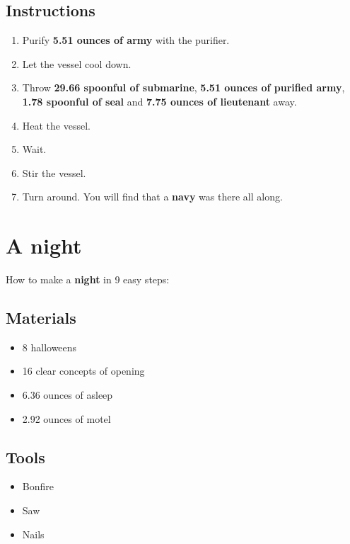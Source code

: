\documentclass{article}
\begin{document}
\subsection{Instructions}\begin{enumerate}
\item 
Purify \textbf{5.51 ounces of army} with the purifier.
\item 
Let the vessel cool down.
\item 
Throw \textbf{29.66 spoonful of submarine}, \textbf{5.51 ounces of purified army}, \textbf{1.78 spoonful of seal} and \textbf{7.75 ounces of lieutenant} away.
\item 
Heat the vessel.
\item 
Wait.
\item 
Stir the vessel.
\item 
Turn around. You will find that a \textbf{navy} was there all along.
\end{enumerate}
\newpage
\section{A night}How to make a \textbf{night} in 9 easy steps:

\subsection{Materials}\begin{itemize}
\item 
8 halloweens
\item 
16 clear concepts of opening
\item 
6.36 ounces of asleep
\item 
2.92 ounces of motel
\end{itemize}
\subsection{Tools}\begin{itemize}
\item 
Bonfire
\item 
Saw
\item 
Nails
\end{itemize}
\end{document}
